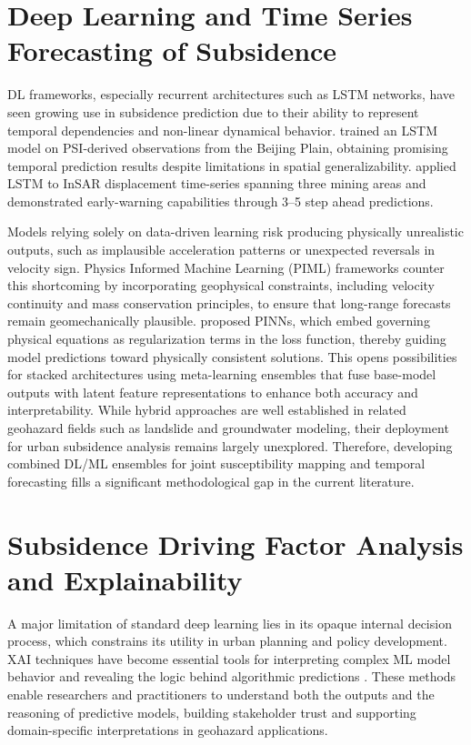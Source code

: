 \documentclass[oneside,doublespacing,flushright]{lsuthesis}
\begin{document}
\section{Deep Learning and Time Series Forecasting of Subsidence}

DL frameworks, especially recurrent architectures such as LSTM networks, have seen growing use in subsidence prediction due to their ability to represent temporal dependencies and non-linear dynamical behavior. \citet{Li2020} trained an LSTM model on PSI-derived observations from the Beijing Plain, obtaining promising temporal prediction results despite limitations in spatial generalizability. \citet{Mirmazloumi2023} applied LSTM to InSAR displacement time-series spanning three mining areas and demonstrated early-warning capabilities through 3--5 step ahead predictions.

Models relying solely on data-driven learning risk producing physically unrealistic outputs, such as implausible acceleration patterns or 
unexpected reversals in velocity sign. Physics Informed Machine Learning (PIML) frameworks counter this shortcoming by incorporating geophysical constraints, including velocity continuity and mass conservation principles, to ensure that long-range forecasts remain geomechanically plausible. \citet{Raissi2019} proposed PINNs, which embed governing physical equations as regularization terms in the loss function, thereby guiding model predictions toward physically consistent solutions. This opens possibilities for stacked architectures using meta-learning ensembles that fuse base-model outputs with latent feature representations to enhance both accuracy and interpretability. While hybrid approaches are well established in related geohazard fields such as landslide and groundwater modeling, their deployment for urban subsidence analysis remains largely unexplored. Therefore, developing combined DL/ML ensembles for joint susceptibility mapping and temporal forecasting fills a significant methodological gap in the current literature.


\section{Subsidence Driving Factor Analysis and Explainability}

A major limitation of standard deep learning lies in its opaque internal decision process, which constrains its utility in urban planning and policy development. XAI techniques have become essential tools for interpreting complex ML model behavior and revealing the logic behind algorithmic predictions \citep{Mohammadifar2021}. These methods enable researchers and practitioners to understand both the outputs and the reasoning of predictive models, building stakeholder trust and supporting domain-specific interpretations in geohazard applications.
\end{document}
